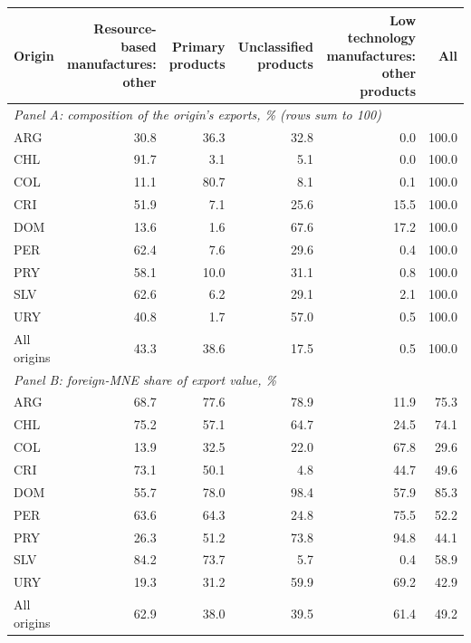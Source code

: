 \begin{tabular}{lrrrrr}
\toprule
Origin & Resource-based manufactures: other & Primary products & Unclassified products & Low technology manufactures: other products & All \\
\midrule
\multicolumn{6}{l}{\textit{Panel A: composition of the origin's exports, \% (rows sum to 100)}} \\
ARG & 30.8 & 36.3 & 32.8 & 0.0 & 100.0 \\
CHL & 91.7 & 3.1 & 5.1 & 0.0 & 100.0 \\
COL & 11.1 & 80.7 & 8.1 & 0.1 & 100.0 \\
CRI & 51.9 & 7.1 & 25.6 & 15.5 & 100.0 \\
DOM & 13.6 & 1.6 & 67.6 & 17.2 & 100.0 \\
PER & 62.4 & 7.6 & 29.6 & 0.4 & 100.0 \\
PRY & 58.1 & 10.0 & 31.1 & 0.8 & 100.0 \\
SLV & 62.6 & 6.2 & 29.1 & 2.1 & 100.0 \\
URY & 40.8 & 1.7 & 57.0 & 0.5 & 100.0 \\
All origins & 43.3 & 38.6 & 17.5 & 0.5 & 100.0 \\
\midrule
\multicolumn{6}{l}{\textit{Panel B: foreign-MNE share of export value, \%}} \\
ARG & 68.7 & 77.6 & 78.9 & 11.9 & 75.3 \\
CHL & 75.2 & 57.1 & 64.7 & 24.5 & 74.1 \\
COL & 13.9 & 32.5 & 22.0 & 67.8 & 29.6 \\
CRI & 73.1 & 50.1 & 4.8 & 44.7 & 49.6 \\
DOM & 55.7 & 78.0 & 98.4 & 57.9 & 85.3 \\
PER & 63.6 & 64.3 & 24.8 & 75.5 & 52.2 \\
PRY & 26.3 & 51.2 & 73.8 & 94.8 & 44.1 \\
SLV & 84.2 & 73.7 & 5.7 & 0.4 & 58.9 \\
URY & 19.3 & 31.2 & 59.9 & 69.2 & 42.9 \\
All origins & 62.9 & 38.0 & 39.5 & 61.4 & 49.2 \\
\bottomrule
\end{tabular}
